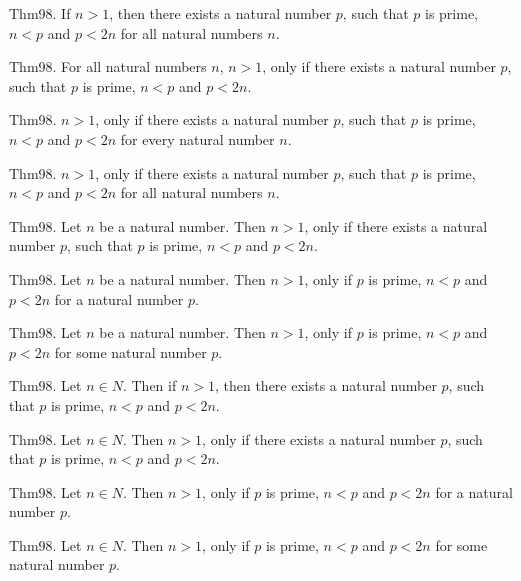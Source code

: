 \documentclass{article}
\begin{document}
Thm98. If $n > 1$, then there exists a natural number $p$, such that $p$ is prime, $n < p$ and $p < 2 n$ for all natural numbers $n$.

Thm98. For all natural numbers $n$, $n > 1$, only if there exists a natural number $p$, such that $p$ is prime, $n < p$ and $p < 2 n$.

Thm98. $n > 1$, only if there exists a natural number $p$, such that $p$ is prime, $n < p$ and $p < 2 n$ for every natural number $n$.

Thm98. $n > 1$, only if there exists a natural number $p$, such that $p$ is prime, $n < p$ and $p < 2 n$ for all natural numbers $n$.

Thm98. Let $n$ be a natural number. Then $n > 1$, only if there exists a natural number $p$, such that $p$ is prime, $n < p$ and $p < 2 n$.

Thm98. Let $n$ be a natural number. Then $n > 1$, only if $p$ is prime, $n < p$ and $p < 2 n$ for a natural number $p$.

Thm98. Let $n$ be a natural number. Then $n > 1$, only if $p$ is prime, $n < p$ and $p < 2 n$ for some natural number $p$.

Thm98. Let $n \in N$. Then if $n > 1$, then there exists a natural number $p$, such that $p$ is prime, $n < p$ and $p < 2 n$.

Thm98. Let $n \in N$. Then $n > 1$, only if there exists a natural number $p$, such that $p$ is prime, $n < p$ and $p < 2 n$.

Thm98. Let $n \in N$. Then $n > 1$, only if $p$ is prime, $n < p$ and $p < 2 n$ for a natural number $p$.

Thm98. Let $n \in N$. Then $n > 1$, only if $p$ is prime, $n < p$ and $p < 2 n$ for some natural number $p$.
\end{document}
